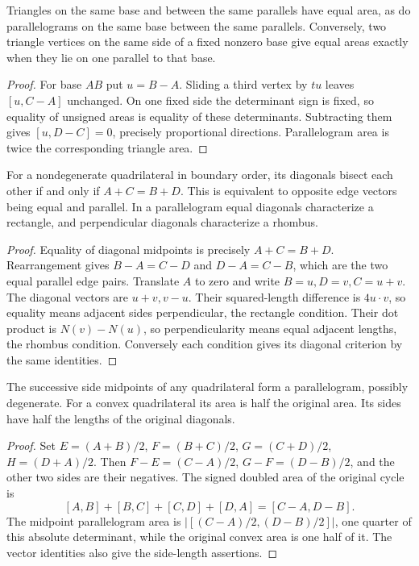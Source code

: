 \begin{theorem}\label{poly:parallel-areas}
Triangles on the same base and between the same parallels have equal
area, as do parallelograms on the same base between the same parallels.
Conversely, two triangle vertices on the same side of a fixed nonzero
base give equal areas exactly when they lie on one parallel to that base.
\end{theorem}
\begin{proof}
For base $AB$ put $u=B-A$. Sliding a third vertex by $tu$ leaves
$[u,C-A]$ unchanged. On one fixed side the determinant sign is fixed,
so equality of unsigned areas is equality of these determinants.
Subtracting them gives $[u,D-C]=0$, precisely proportional directions.
Parallelogram area is twice the corresponding triangle area.
\end{proof}

\begin{theorem}\label{poly:parallelogram}
For a nondegenerate quadrilateral in boundary order, its diagonals bisect
each other if and only if $A+C=B+D$. This is equivalent to opposite
edge vectors being equal and parallel. In a parallelogram equal diagonals
characterize a rectangle, and perpendicular diagonals characterize a rhombus.
\end{theorem}
\begin{proof}
Equality of diagonal midpoints is precisely $A+C=B+D$. Rearrangement
gives $B-A=C-D$ and $D-A=C-B$, which are the two equal parallel
edge pairs. Translate $A$ to zero and write $B=u,D=v,C=u+v$.
The diagonal vectors are $u+v,v-u$.
Their squared-length difference is $4u\cdot v$, so equality means
adjacent sides perpendicular, the rectangle condition. Their dot product
is $N(v)-N(u)$, so perpendicularity means equal adjacent lengths,
the rhombus condition. Conversely each condition gives its diagonal
criterion by the same identities.
\end{proof}

\begin{theorem}\label{poly:varignon}
The successive side midpoints of any quadrilateral form a parallelogram,
possibly degenerate. For a convex quadrilateral its area is half the
original area. Its sides have half the lengths of the original diagonals.
\end{theorem}
\begin{proof}
Set $E=(A+B)/2$, $F=(B+C)/2$, $G=(C+D)/2$, $H=(D+A)/2$.
Then $F-E=(C-A)/2$, $G-F=(D-B)/2$, and the other two sides
are their negatives. The signed doubled area of the original cycle is
\[
 [A,B]+[B,C]+[C,D]+[D,A]=[C-A,D-B].
\]
The midpoint parallelogram area is
$|[(C-A)/2,(D-B)/2]|$, one quarter of this absolute determinant,
while the original convex area is one half of it. The vector identities
also give the side-length assertions.
\end{proof}

